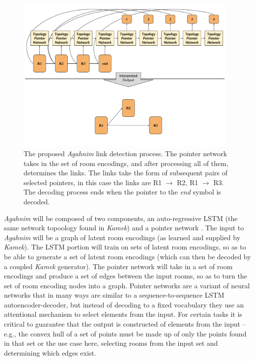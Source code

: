 \documentclass[12pt]{report}
\begin{document}
\begin{figure}[ht]
\centering
    \includegraphics[width=0.97\textwidth]{figures/Agahnim_Pointer_Process.pdf} 
   
    \caption{The proposed \textit{Agahnim} link detection process.  The pointer network takes in the set of room encodings, and after processing all of them, determines the links. The links take the form of subsequent pairs of selected pointers, in this case the links are R1 $\rightarrow$ R2, R1 $\rightarrow$ R3. The decoding process ends when the pointer to the \textit{end} symbol is decoded.}
  \label{fig:agahnim}
  \end{figure}


\textit{Agahnim} will be composed of two components, an auto-regressive LSTM (the same network topoology found in \textit{Kamek}) and a pointer network \cite{pointer_network}.  The input to \textit{Agahnim} will be a graph of latent room encodings (as learned and supplied by \textit{Kamek}).  The LSTM portion will train on sets of latent room encodings, so as to be able to generate a set of latent room encodings (which can then be decoded by a coupled \textit{Kamek} generator).  The pointer network will take in a set of room encodings and produce a set of edges between the input rooms, so as to turn the set of room encoding nodes into a graph.   Pointer networks are a variant of neural networks that in many ways are similar to a sequence-to-sequence LSTM autoencoder-decoder, but instead of decoding to a fixed vocabulary they use an attentional mechanism to select elements from the input.  For certain tasks it is critical to guarantee that the output is constructed of elements from the input -- e.g., the convex hull of a set of points must be made up of only the points found in that set or the use case here, selecting rooms from the input set and determining which edges exist.
  
\end{document}
